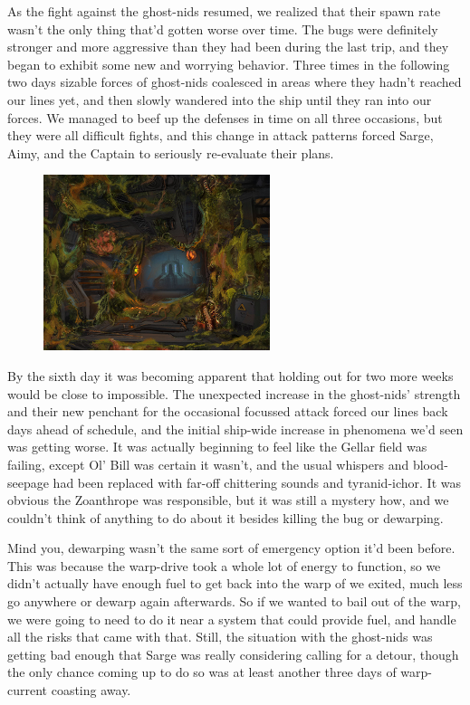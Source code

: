 As the fight against the ghost-nids resumed, we realized that their spawn rate wasn't the only thing that'd gotten worse over time. 
The bugs were definitely stronger and more aggressive than they had been during the last trip, and they began to exhibit some new and worrying behavior. 
Three times in the following two days sizable forces of ghost-nids coalesced in areas where they hadn't reached our lines yet, and then slowly wandered into the ship until they ran into our forces. 
We managed to beef up the defenses in time on all three occasions, but they were all difficult fights, and this change in attack patterns forced Sarge, Aimy, and the Captain to seriously re-evaluate their plans.

\begin{figure}
	\begin{center}
		\includegraphics[width=\figwidth]{pics/15/36.png}
	\end{center}
\end{figure}
By the sixth day it was becoming apparent that holding out for two more weeks would be close to impossible. 
The unexpected increase in the ghost-nids' strength and their new penchant for the occasional focussed attack forced our lines back days ahead of schedule, and the initial ship-wide increase in phenomena we'd seen was getting worse. 
It was actually beginning to feel like the Gellar field was failing, except Ol' Bill was certain it wasn't, and the usual whispers and blood-seepage had been replaced with far-off chittering sounds and tyranid-ichor. 
It was obvious the Zoanthrope was responsible, but it was still a mystery how, and we couldn't think of anything to do about it besides killing the bug or dewarping.

Mind you, dewarping wasn't the same sort of emergency option it'd been before. 
This was because the warp-drive took a whole lot of energy to function, so we didn't actually have enough fuel to get back into the warp of we exited, much less go anywhere or dewarp again afterwards. 
So if we wanted to bail out of the warp, we were going to need to do it near a system that could provide fuel, and handle all the risks that came with that. 
Still, the situation with the ghost-nids was getting bad enough that Sarge was really considering calling for a detour, though the only chance coming up to do so was at least another three days of warp-current coasting away.

